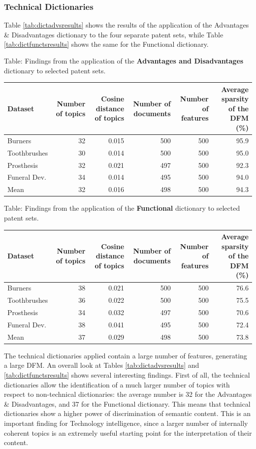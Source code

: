 \documentclass[]{book}
\begin{document}
\subsubsection*{Technical Dictionaries}\label{technical-dictionaries}

Table \ref{tab:dictadvsresults} shows the results of the application of
the Advantages \& Disadvantages dictionary to the four separate patent
sets, while Table \ref{tab:dictfunctsresults} shows the same for the
Functional dictionary.

Table: \label{tab:dictadvsresults} Findings from the application of the
\textbf{Advantages and Disadvantages} dictionary to selected patent
sets.

\begin{tabular}{l|r|r|r|r|r}
\hline
Dataset & Number of topics & Cosine distance of topics & Number of documents & Number of features & Average sparsity of the DFM (\%)\\
\hline
Burners & 32 & 0.015 & 500 & 500 & 95.9\\
\hline
Toothbrushes & 30 & 0.014 & 500 & 500 & 95.0\\
\hline
Prosthesis & 32 & 0.021 & 497 & 500 & 92.3\\
\hline
Funeral Dev. & 34 & 0.014 & 495 & 500 & 94.0\\
\hline
Mean & 32 & 0.016 & 498 & 500 & 94.3\\
\hline
\end{tabular}

Table: \label{tab:dictfunctsresults} Findings from the application of the
\textbf{Functional} dictionary to selected patent sets.

\begin{tabular}{l|r|r|r|r|r}
\hline
Dataset & Number of topics & Cosine distance of topics & Number of documents & Number of features & Average sparsity of the DFM (\%)\\
\hline
Burners & 38 & 0.021 & 500 & 500 & 76.6\\
\hline
Toothbrushes & 36 & 0.022 & 500 & 500 & 75.5\\
\hline
Prosthesis & 34 & 0.032 & 497 & 500 & 70.6\\
\hline
Funeral Dev. & 38 & 0.041 & 495 & 500 & 72.4\\
\hline
Mean & 37 & 0.029 & 498 & 500 & 73.8\\
\hline
\end{tabular}

The technical dictionaries applied contain a large number of features,
generating a large DFM. An overall look at Tables
\ref{tab:dictadvsresults} and \ref{tab:dictfunctsresults} shows several
interesting findings. First of all, the technical dictionaries allow the
identification of a much larger number of topics with respect to
non-technical dictionaries: the average number is 32 for the Advantages
\& Disadvantages, and 37 for the Functional dictionary. This means that
technical dictionaries show a higher power of discrimination of semantic
content. This is an important finding for Technology intelligence, since
a larger number of internally coherent topics is an extremely useful
starting point for the interpretation of their content.
\end{document}
